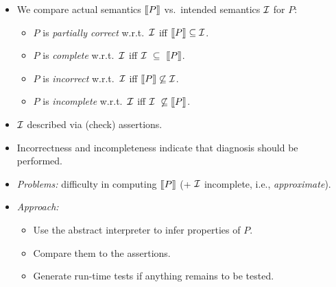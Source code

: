 \documentclass{article}
\renewcommand{\_}{\char'137}
\newcommand{\p}{{\sem{P}}}
\newcommand{\sem}[1]{\lsem #1 \rsem}
\newcommand{\lsem}{\mbox{$\lbrack\hspace{-0.3ex}\lbrack$}}
\newcommand{\rsem}{\mbox{$\rbrack\hspace{-0.3ex}\rbrack$}}
\newcommand{\I}{\mbox{$\cal I$}}
\begin{document}
\begin{itemize}
\item We compare actual semantics $\p$ vs.~intended semantics $\I$ for $P$:
  \begin{itemize}
  \item $P$ is {\em partially  correct} w.r.t.\ $\I$ iff \hspace*{.8cm}
    $\p \subseteq \I$. 
  \item $P$ is {\em complete} w.r.t.\ $\I$ iff \hspace*{2cm}
    $\I\ \subseteq\  \p$.
  \item $P$ is {\em incorrect} w.r.t.\ $\I$ iff \hspace*{2cm}
    $\p \not\subseteq \I$.
  \item $P$ is {\em incomplete} w.r.t.\ $\I$ iff \hspace*{1.8cm}
    $\I\ \not\subseteq \p$.
  \end{itemize}
\item $\I$ described via (check) assertions.
\item Incorrectness and incompleteness indicate that diagnosis should be
  performed. 
\item {\em Problems:} difficulty in computing $\p$ (+ $\I$ incomplete,
i.e., {\em approximate}).
\item {\em Approach:} 
  \begin{itemize}
  \item Use the abstract interpreter to infer properties of $P$.
  \item Compare them to the assertions.
  \item Generate run-time tests if anything remains to be tested.
  \end{itemize}
\end{itemize}

\end{document}
